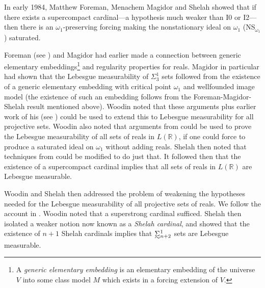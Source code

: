 \documentclass{book}%
\def\underTilde#1{{\baselineskip=0pt\vtop{\hbox{$#1$}\hbox{$\sim$}}}{}}
\newcommand{\uTSigma}{\underTilde{\Sigma}}
\begin{document}

In early 1984, Matthew Foreman, Menachem
Magidor and Shelah
 showed that if there exists a
supercompact cardinal---a hypothesis much weaker than I0 or I2---then
there is an $\omega_{1}$-preserving forcing making the
nonstationary ideal on $\omega_{1}$ (NS$_{\omega_{1}}$) saturated.

Foreman (see ) and Magidor  had
earlier made a connection between generic elementary
embeddings\footnote{A \emph{generic elementary embedding} is an
elementary embedding of the universe $V$ into some class model $M$
which exists in a forcing extension of $V$.} and regularity
properties for reals. Magidor  in particular had
shown that the Lebesgue measurability of $\Sigma^{1}_{3}$ sets
followed from the existence of a generic elementary embedding with
critical point $\omega_{1}$ and wellfounded image model (the existence of such an
embedding follows from the Foreman-Magidor-Shelah result mentioned
above). Woodin noted that these arguments plus earlier work of his
(see ) could be used to extend this to Lebesgue
measurability for all projective sets. Woodin also noted that
arguments from \cite{ForemanMagidorShelah:1988} could be used to
prove the Lebesgue measurability of all sets of reals in
$L(\mathbb{R})$, if one could force to produce a saturated ideal on
$\omega_{1}$ without adding reals. Shelah then noted that techniques
from \cite{Shelah:PIF} could be modified to do just that. It followed then that the existence of a supercompact
cardinal implies that all sets of reals in $L(\mathbb{R})$ are Lebesgue measurable.

Woodin and Shelah then addressed the problem of weakening the
hypotheses needed for the Lebesgue measurability of all projective sets of
reals. We follow the account in \cite{Neeman:DLG}. Woodin noted that
a superstrong cardinal sufficed. Shelah then isolated a weaker
notion now known as a \emph{Shelah cardinal}, and showed that
the existence of $n+1$ Shelah cardinals implies that
$\uTSigma^{1}_{n+2}$ sets are Lebesgue measurable.
\end{document}
